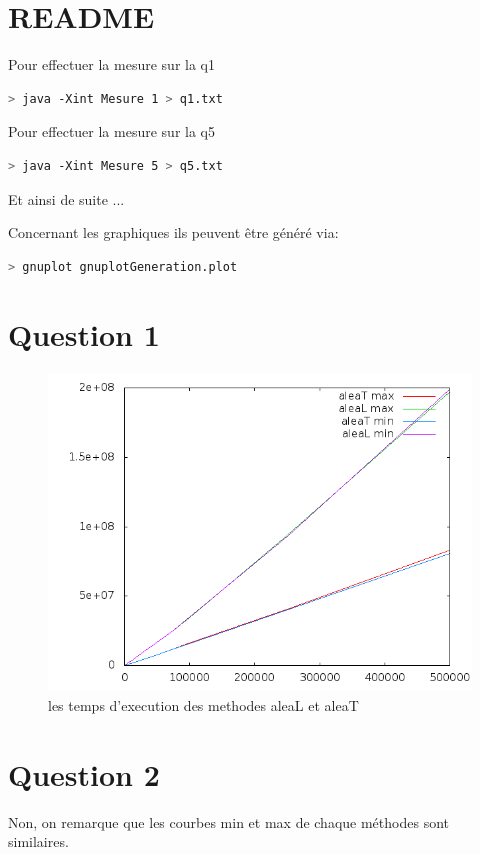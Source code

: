 \documentclass[a4paper,12pt]{report}
\begin{document}
\section*{README}

Pour effectuer la mesure sur la q1
\begin{lstlisting}[language=bash]
> java -Xint Mesure 1 > q1.txt
\end{lstlisting}
Pour effectuer la mesure sur la q5
\begin{lstlisting}[language=bash]
> java -Xint Mesure 5 > q5.txt
\end{lstlisting}
Et ainsi de suite ...

Concernant les graphiques ils peuvent être généré via:
\begin{lstlisting}[language=bash]
> gnuplot gnuplotGeneration.plot
\end{lstlisting}

\section*{Question 1}
\begin{figure}[!ht]
	\center
	\includegraphics[scale=0.5]{q1.png}
	\caption{les temps d’execution des methodes aleaL et aleaT}
\end{figure}

\section*{Question 2}
Non, on remarque que les courbes min et max de chaque méthodes sont similaires.
\end{document}
